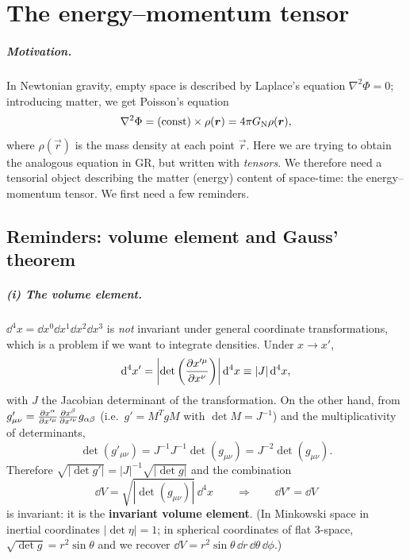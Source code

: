\chapter{The energy--momentum tensor}\label{ch:emt}

\paragraph{Motivation.} In Newtonian gravity, empty space is described by Laplace's equation $\nabla^2\Phi=0$; introducing matter, we get Poisson's equation
\[
  \nabla^2\Phi=(\text{const})\times\rho(\bm{r})=4\pi G_{\mathrm N}\rho(\bm{r}),
\]
where $\rho(\vec r)$ is the mass density at each point $\vec r$. Here we are trying to obtain the analogous equation in GR, but written with \emph{tensors}. We therefore need a tensorial object describing the matter (energy) content of space-time: the energy--momentum tensor. We first need a few reminders.

\section{Reminders: volume element and Gauss' theorem}

\paragraph{(i) The volume element.} $\dd^4x=\dd x^0\dd x^1\dd x^2\dd x^3$ is \emph{not} invariant under general coordinate transformations, which is a problem if we want to integrate densities. Under $x\to x'$,
\begin{equation}
  \mathrm{d}^4x'=\left|\det\left(\frac{\partial x'^\mu}{\partial x^\nu}\right)\right|\mathrm{d}^4x\equiv|J|\,\mathrm{d}^4x ,
\end{equation}
with $J$ the Jacobian determinant of the transformation. On the other hand, from $g'_{\mu\nu}=\frac{\partial x^\alpha}{\partial x'^\mu}\frac{\partial x^\beta}{\partial x'^\nu}g_{\alpha\beta}$ (i.e.\ $g'=M^TgM$ with $\det M=J^{-1}$) and the multiplicativity of determinants,
\begin{equation}
  \det(g'_{\mu\nu})=J^{-1}J^{-1}\det(g_{\mu\nu})=J^{-2}\det(g_{\mu\nu}).
\end{equation}
Therefore $\sqrt{|\det g'|}=|J|^{-1}\sqrt{|\det g|}$ and the combination
\begin{equation}
  \boxed{\dd V=\sqrt{|\det(g_{\mu\nu})|}\,\dd^4x}\qquad\Longrightarrow\qquad\dd V'=\dd V
\end{equation}
is invariant: it is the \textbf{invariant volume element}. (In Minkowski space in inertial coordinates $|\det\eta|=1$; in spherical coordinates of flat 3-space, $\sqrt{\det g}=r^2\sin\theta$ and we recover $\dd V=r^2\sin\theta\,\dd r\,\dd\theta\,\dd\phi$.)

